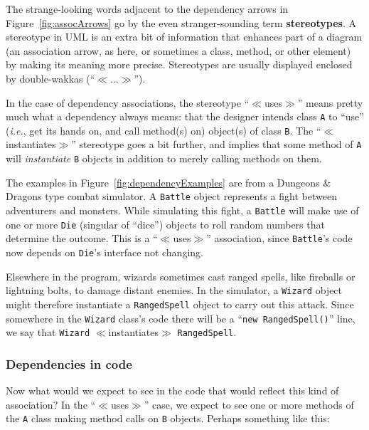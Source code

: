 The strange-looking words adjacent to the dependency arrows in
Figure~\ref{fig:assocArrows} go by the even stranger-sounding term
\textbf{stereotypes}. A stereotype in UML is an extra bit of information that
enhances part of a diagram (an association arrow, as here, or sometimes a
class, method, or other element) by making its meaning more precise.
Stereotypes are usually displayed enclosed by double-wakkas
(``$\ll$...$\gg$'').

In the case of dependency associations, the stereotype ``$\ll$uses$\gg$'' means
pretty much what a dependency always means: that the designer intends class
\texttt{A} to ``use'' (\textit{i.e.}, get its hands on, and call method(s) on)
object(s) of class \texttt{B}. The ``$\ll$instantiates$\gg$'' stereotype goes a
bit further, and implies that some method of \texttt{A} will
\textit{instantiate} \texttt{B} objects in addition to merely calling methods
on them.

The examples in Figure~\ref{fig:dependencyExamples} are from a Dungeons \&
Dragons type combat simulator. A \texttt{Battle} object represents a fight
between adventurers and monsters. While simulating this fight, a
\texttt{Battle} will make use of one or more \texttt{Die} (singular of ``dice'')
objects to roll random numbers that determine the outcome. This is a
``$\ll$uses$\gg$'' association, since \texttt{Battle}'s code now depends on
\texttt{Die}'s interface not changing.

Elsewhere in the program, wizards sometimes cast ranged spells, like fireballs
or lightning bolts, to damage distant enemies. In the simulator, a
\texttt{Wizard} object might therefore instantiate a \texttt{RangedSpell}
object to carry out this attack. Since somewhere in the \texttt{Wizard} class's
code there will be a ``\texttt{new RangedSpell()}'' line, we say that
\texttt{Wizard} $\ll$instantiates$\gg$ \texttt{RangedSpell}.

\subsubsection{Dependencies in code}

Now what would we expect to see in the code that would reflect this kind of
association? In the ``$\ll$uses$\gg$'' case, we expect to see one or more
methods of the \texttt{A} class making method calls on \texttt{B} objects.
Perhaps something like this:

